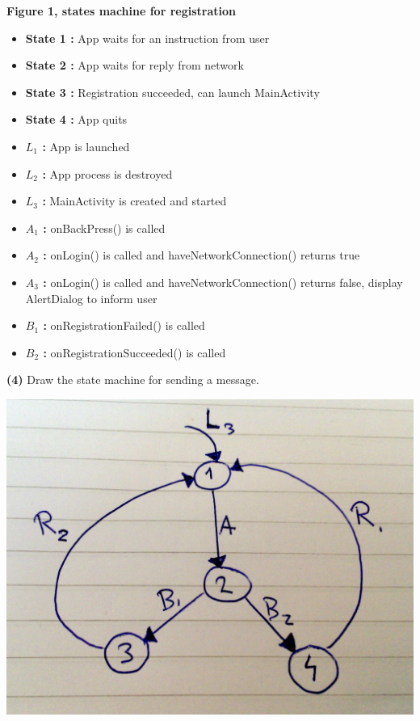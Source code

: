 \documentclass[11pt]{article}
\renewcommand\part[1]{\vspace{.10in}\textbf{(#1)}}
\begin{document}
\textbf{Figure 1, states machine for registration}

\begin{itemize}
	\item \textbf{State 1 : } App waits for an instruction from user
	\item \textbf{State 2 : } App waits for reply from network
	\item \textbf{State 3 : } Registration succeeded, can launch MainActivity
	\item \textbf{State 4 : } App quits
	\item \textbf{$L_{1}$ : } App is launched
	\item \textbf{$L_{2}$ : } App process is destroyed
	\item \textbf{$L_{3}$ : } MainActivity is created and started
	\item \textbf{$A_{1}$ : } onBackPress() is called
	\item \textbf{$A_{2}$ : } onLogin() is called and haveNetworkConnection() returns true
	\item \textbf{$A_{3}$ : } onLogin() is called and haveNetworkConnection() returns false, display AlertDialog to inform user
	\item \textbf{$B_{1}$ : } onRegistrationFailed() is called
	\item \textbf{$B_{2}$ : } onRegistrationSucceeded() is called
\end{itemize}

\clearpage

\part{4}
Draw the state machine for sending a message.

\includegraphics[scale=0.15]{sendMessageStates.jpg}
\end{document}
